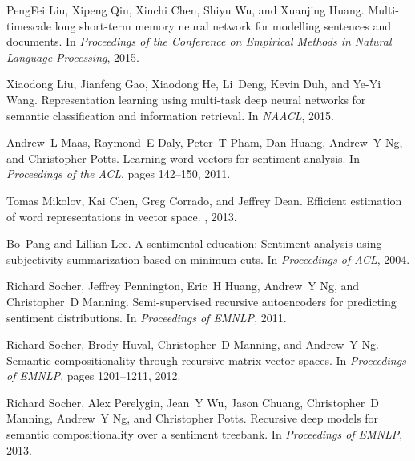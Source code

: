 \documentclass{article}
\begin{document}
\begin{thebibliography}{}
PengFei Liu, Xipeng Qiu, Xinchi Chen, Shiyu Wu, and Xuanjing Huang.
\newblock Multi-timescale long short-term memory neural network for modelling
  sentences and documents.
\newblock In {\em Proceedings of the Conference on Empirical Methods in Natural
  Language Processing}, 2015.

Xiaodong Liu, Jianfeng Gao, Xiaodong He, Li~Deng, Kevin Duh, and Ye-Yi Wang.
\newblock Representation learning using multi-task deep neural networks for
  semantic classification and information retrieval.
\newblock In {\em NAACL}, 2015.

Andrew~L Maas, Raymond~E Daly, Peter~T Pham, Dan Huang, Andrew~Y Ng, and
  Christopher Potts.
\newblock Learning word vectors for sentiment analysis.
\newblock In {\em Proceedings of the ACL}, pages 142--150, 2011.

Tomas Mikolov, Kai Chen, Greg Corrado, and Jeffrey Dean.
\newblock Efficient estimation of word representations in vector space.
, 2013.

Bo~Pang and Lillian Lee.
\newblock A sentimental education: Sentiment analysis using subjectivity
  summarization based on minimum cuts.
\newblock In {\em Proceedings of ACL}, 2004.

Richard Socher, Jeffrey Pennington, Eric~H Huang, Andrew~Y Ng, and
  Christopher~D Manning.
\newblock Semi-supervised recursive autoencoders for predicting sentiment
  distributions.
\newblock In {\em Proceedings of EMNLP}, 2011.

Richard Socher, Brody Huval, Christopher~D Manning, and Andrew~Y Ng.
\newblock Semantic compositionality through recursive matrix-vector spaces.
\newblock In {\em Proceedings of EMNLP}, pages 1201--1211, 2012.

Richard Socher, Alex Perelygin, Jean~Y Wu, Jason Chuang, Christopher~D Manning,
  Andrew~Y Ng, and Christopher Potts.
\newblock Recursive deep models for semantic compositionality over a sentiment
  treebank.
\newblock In {\em Proceedings of EMNLP}, 2013.


\end{thebibliography}
\end{document}
